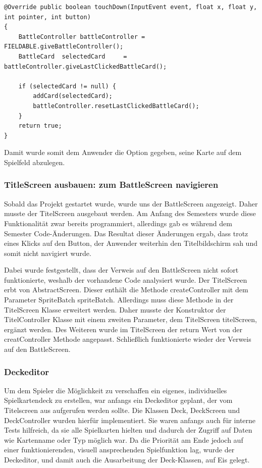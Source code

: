 \begin{lstlisting}[basicstyle=\tiny]
@Override public boolean touchDown(InputEvent event, float x, float y, int pointer, int button)
{
    BattleController battleController = FIELDABLE.giveBattleController();
    BattleCard  selectedCard     = battleController.giveLastClickedBattleCard();

    if (selectedCard != null) {
        addCard(selectedCard);
        battleController.resetLastClickedBattleCard();
    }
    return true;
}
\end{lstlisting}

Damit wurde somit dem Anwender die Option gegeben, seine Karte auf dem Spielfeld abzulegen. 

\subsubsection{TitleScreen ausbauen: zum BattleScreen navigieren}
Sobald das Projekt gestartet wurde, wurde uns der BattleScreen angezeigt. Daher musste der TitelScreen ausgebaut werden. Am Anfang des Semesters wurde diese Funktionalität zwar bereits programmiert, allerdings gab es während dem Semester Code-Änderungen. Das Resultat dieser Änderungen ergab, dass trotz eines Klicks auf den Button, der Anwender weiterhin den Titelbildschirm sah und somit nicht navigiert wurde. 

Dabei wurde festgestellt, dass der Verweis auf den BattleScreen nicht sofort funktionierte, weshalb der vorhandene Code analysiert wurde. Der TitelScreen erbt von AbstractScreen. Dieser enthält die Methode createController mit dem Parameter SpriteBatch spriteBatch. Allerdings muss diese Methode in der TitelScreen Klasse erweitert werden. Daher musste der Konstruktor der TitelController Klasse mit einem zweiten Parameter, dem TitelScreen titelScreen, ergänzt werden. Des Weiteren wurde im TitelScreen der return Wert von der creatController Methode angepasst. Schließlich funktionierte wieder der Verweis auf den BattleScreen. 

\subsubsection{Deckeditor}
Um dem Spieler die Möglichkeit zu verschaffen ein eigenes, individuelles Spielkartendeck zu erstellen, war anfangs ein Deckeditor geplant, der vom Titelscreen aus aufgerufen werden sollte. Die Klassen Deck, DeckScreen und DeckController wurden hierfür implementiert. Sie waren anfangs auch für interne Tests hilfreich, da sie alle Spielkarten hielten und dadurch der Zugriff auf Daten wie Kartenname oder Typ möglich war. Da die Priorität am Ende jedoch auf einer funktionierenden, visuell ansprechenden Spielfunktion lag, wurde der Deckeditor, und damit auch die Ausarbeitung der Deck-Klassen, auf Eis gelegt.


